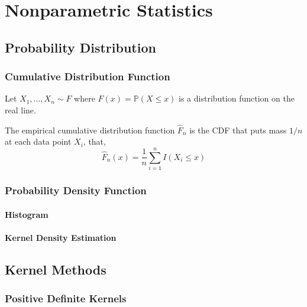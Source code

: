 \chapter{Nonparametric Statistics}

\section{Probability Distribution}

\subsection{Cumulative Distribution Function}

Let $X_{1},\ldots,X_{n}\sim F$ where $F(x)=\mathbb{P}(X\leq x)$ is a distribution function on the real line.

\begin{definition}
    The empirical cumulative distribution function $\widehat{F}_{n}$ is the CDF that puts mass $1/n$ at each data point $X_{i}$, that,
    \begin{equation}
        \widehat{F}_{n}(x)=\frac{1}{n}\sum_{i=1}^{n}I\left(X_{i}\leq x\right)
    \end{equation}
\end{definition}

\subsection{Probability Density Function}

\subsubsection{Histogram}

\subsubsection{Kernel Density Estimation}

\section{Kernel Methods}

\subsection{Positive Definite Kernels}

